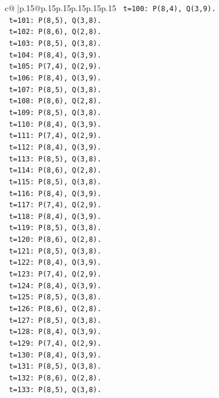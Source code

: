 \documentclass{article}
\begin{document}
{\begin{supertabular}{c@{$\;$}|p{.15\linewidth}@{}p{.15\linewidth}p{.15\linewidth}p{.15\linewidth}p{.15\linewidth}p{.15\linewidth}}
{{{\texttt{   t=100: P(8,4), Q(3,9).} \\
\texttt{   t=101: P(8,5), Q(3,8).} \\
\texttt{   t=102: P(8,6), Q(2,8).} \\
\texttt{   t=103: P(8,5), Q(3,8).} \\
\texttt{   t=104: P(8,4), Q(3,9).} \\
\texttt{   t=105: P(7,4), Q(2,9).} \\
\texttt{   t=106: P(8,4), Q(3,9).} \\
\texttt{   t=107: P(8,5), Q(3,8).} \\
\texttt{   t=108: P(8,6), Q(2,8).} \\
\texttt{   t=109: P(8,5), Q(3,8).} \\
\texttt{   t=110: P(8,4), Q(3,9).} \\
\texttt{   t=111: P(7,4), Q(2,9).} \\
\texttt{   t=112: P(8,4), Q(3,9).} \\
\texttt{   t=113: P(8,5), Q(3,8).} \\
\texttt{   t=114: P(8,6), Q(2,8).} \\
\texttt{   t=115: P(8,5), Q(3,8).} \\
\texttt{   t=116: P(8,4), Q(3,9).} \\
\texttt{   t=117: P(7,4), Q(2,9).} \\
\texttt{   t=118: P(8,4), Q(3,9).} \\
\texttt{   t=119: P(8,5), Q(3,8).} \\
\texttt{   t=120: P(8,6), Q(2,8).} \\
\texttt{   t=121: P(8,5), Q(3,8).} \\
\texttt{   t=122: P(8,4), Q(3,9).} \\
\texttt{   t=123: P(7,4), Q(2,9).} \\
\texttt{   t=124: P(8,4), Q(3,9).} \\
\texttt{   t=125: P(8,5), Q(3,8).} \\
\texttt{   t=126: P(8,6), Q(2,8).} \\
\texttt{   t=127: P(8,5), Q(3,8).} \\
\texttt{   t=128: P(8,4), Q(3,9).} \\
\texttt{   t=129: P(7,4), Q(2,9).} \\
\texttt{   t=130: P(8,4), Q(3,9).} \\
\texttt{   t=131: P(8,5), Q(3,8).} \\
\texttt{   t=132: P(8,6), Q(2,8).} \\
\texttt{   t=133: P(8,5), Q(3,8).} \\
}}}
\end{supertabular}}
\end{document}
